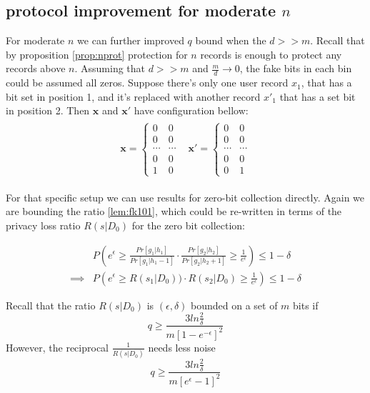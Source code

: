\documentclass[11pt]{article}
\newcommand{\bbx}{\pmb{x}}
\begin{document}
\subsection{protocol improvement for moderate $n$}
For moderate $n$ we can further improved $q$ bound when the $d >> m$.  Recall that by proposition \ref{prop:nprot} protection for $n$ records is enough to protect any records above $n$.   Assuming that  $d >> m$ and $ \frac{m}{d} \rightarrow 0$, the fake bits in each bin could be assumed all zeros.  Suppose there's only one user record $x_1$, that has a bit set in position 1, and it's replaced with another record $x'_1$ that has a set bit in position 2.   Then $\bbx$ and $\bbx'$ have configuration bellow:
\begin{align*}
\begin{matrix}
\bbx =  \left\{\begin{matrix}
0 & 0 \\
0 & 0 \\
\cdots & \cdots \\
0 & 0\\
1 & 0
\end{matrix}\right.
&
\bbx' =  \left\{\begin{matrix}
0 & 0 \\
0 & 0 \\
\cdots & \cdots \\
0 & 0\\
0 & 1
\end{matrix}\right.
\end{matrix}
\end{align*}

For that specific setup we can use results for zero-bit collection directly.   Again we are bounding the ratio \ref{lem:fk101}, which could be re-written in terms of the privacy loss ratio $R(s|D_0)$ for the zero bit collection:

\begin{align} \label{lem:fk202}
& P \left (   e^\epsilon \ge \frac{  Pr[ g_1 | h_1]  } {  Pr[ g_1 | h_1 - 1]  } \cdot \frac{  Pr[ g_2 | h_2]  } {  Pr[ g_2 | h_2 + 1]  }  \ge \frac{1}{e^\epsilon} \right ) \le 1 - \delta  \\
\implies & P \left (   e^\epsilon \ge R(s_1|D_0)) \cdot R(s_2|D_0) \ge \frac{1}{e^\epsilon} \right ) \le 1 - \delta 
\end{align}

Recall that the ratio $R(s|D_0)$ is $(\epsilon, \delta)$ bounded on a set of $m$ bits if
\[  q \ge \frac  { 3  ln\frac{2}{\delta}}  { m\left [ 1 - e^{-\epsilon}\right ] ^2}  \]
However, the reciprocal $\frac{1}{R(s|D_0)}$ needs less noise
\[  q \ge \frac  { 3  ln\frac{2}{\delta}}  { m\left [e^{\epsilon} - 1 \right ] ^2}  \]
\end{document}
